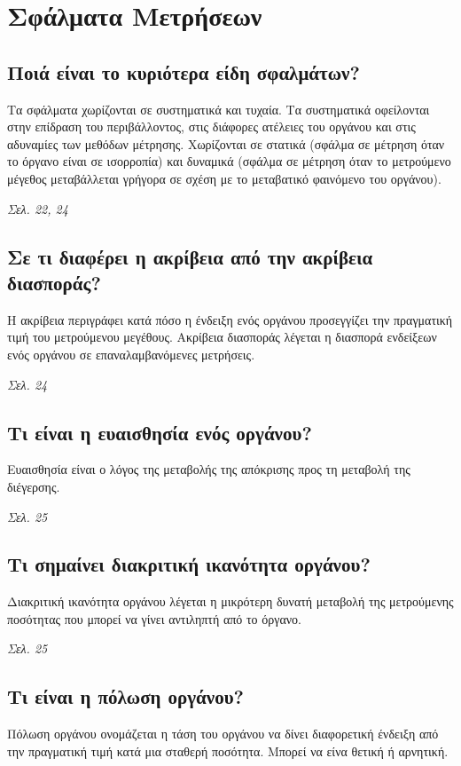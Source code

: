 \documentclass{article}
\begin{document}
\section{Σφάλματα Μετρήσεων}

\subsection{Ποιά είναι το κυριότερα είδη σφαλμάτων?}
Τα σφάλματα χωρίζονται σε συστηματικά και τυχαία. Τα συστηματικά οφείλονται στην επίδραση του περιβάλλοντος, στις διάφορες ατέλειες
του οργάνου και στις αδυναμίες των μεθόδων μέτρησης. Χωρίζονται σε στατικά (σφάλμα σε μέτρηση όταν το όργανο είναι σε ισορροπία) και δυναμικά (σφάλμα σε μέτρηση όταν το
μετρούμενο μέγεθος μεταβάλλεται γρήγορα σε σχέση με το μεταβατικό φαινόμενο του οργάνου).

\emph{Σελ. 22, 24}

\subsection{Σε τι διαφέρει η ακρίβεια από την ακρίβεια διασποράς?}
Η ακρίβεια περιγράφει κατά πόσο η ένδειξη ενός οργάνου προσεγγίζει την πραγματική τιμή του μετρούμενου μεγέθους. Ακρίβεια διασποράς λέγεται η διασπορά ενδείξεων ενός 
οργάνου σε επαναλαμβανόμενες μετρήσεις.

\emph{Σελ. 24}

\subsection{Τι είναι η ευαισθησία ενός οργάνου?}
Ευαισθησία είναι ο λόγος της μεταβολής της απόκρισης προς τη μεταβολή της διέγερσης.

\emph{Σελ. 25}

\subsection{Τι σημαίνει διακριτική ικανότητα οργάνου?}
Διακριτική ικανότητα οργάνου λέγεται η μικρότερη δυνατή μεταβολή της μετρούμενης ποσότητας που μπορεί να γίνει αντιληπτή από το όργανο.

\emph{Σελ. 25}
\subsection{Τι είναι η πόλωση οργάνου?}
Πόλωση οργάνου ονομάζεται η τάση του οργάνου να δίνει διαφορετική ένδειξη από την πραγματική τιμή κατά μια σταθερή ποσότητα. Μπορεί να είνα θετική ή αρνητική.
\end{document}
